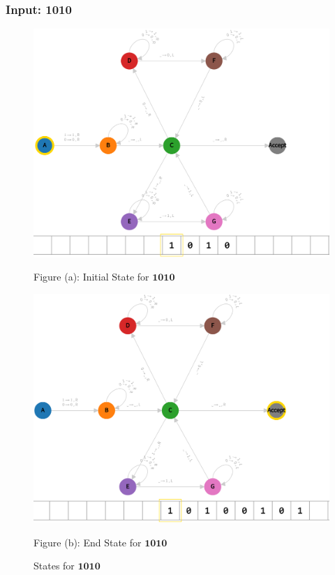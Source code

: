 \subsubsection*{Input: 1010}
\label{q2-1010}

\begin{figure}[ht]
  \centering
  \begin{minipage}{.49\linewidth}
    \centering
    \includegraphics[width=\linewidth]{answers/img/q2-1010-initial.png}
    \caption*{Figure (a): Initial State for $\mathbf{1010}$}
    \label{fig:1010-initial}
  \end{minipage}
  \begin{minipage}{.49\linewidth}
    \centering
    \includegraphics[width=\linewidth]{answers/img/q2-1010-end.png}
    \caption*{Figure (b): End State for $\mathbf{1010}$}
    \label{fig:1010-end}
  \end{minipage}
  \caption{States for $\mathbf{1010}$}
  \label{fig:in-1010}
\end{figure}

